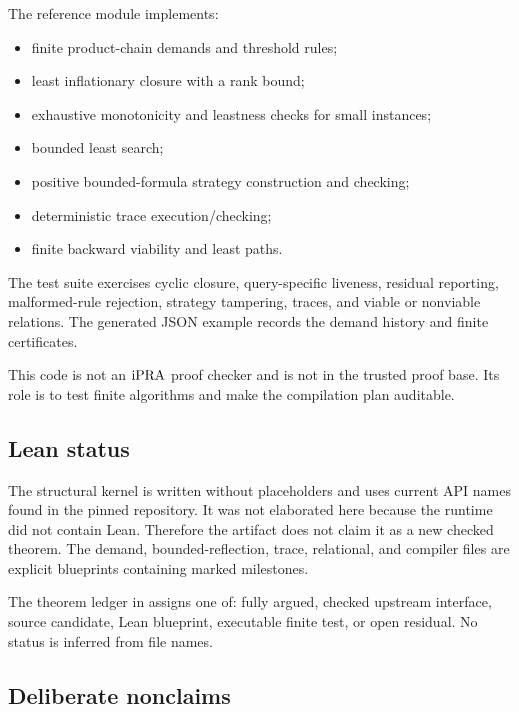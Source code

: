 The reference module  implements:
\begin{itemize}
  \item finite product-chain demands and threshold rules;
  \item least inflationary closure with a rank bound;
  \item exhaustive monotonicity and leastness checks for small instances;
  \item bounded least search;
  \item positive bounded-formula strategy construction and checking;
  \item deterministic trace execution/checking;
  \item finite backward viability and least paths.
\end{itemize}
The test suite exercises cyclic closure, query-specific liveness, residual
reporting, malformed-rule rejection, strategy tampering, traces, and viable or
nonviable relations.  The generated JSON example records the demand history and
finite certificates.

This code is not an \(\mathrm{iPRA}\) proof checker and is not in the trusted proof
base.  Its role is to test finite algorithms and make the compilation plan
auditable.

\subsection{Lean status}

The structural kernel is written without placeholders and uses current API
names found in the pinned repository.  It was not elaborated here because the
runtime did not contain Lean.  Therefore the artifact does not claim it as a
new checked theorem.  The demand, bounded-reflection, trace, relational, and
compiler files are explicit blueprints containing marked 
milestones.

The theorem ledger in  assigns one of:
fully argued, checked upstream interface, source candidate, Lean blueprint,
executable finite test, or open residual.  No status is inferred from file
names.

\subsection{Deliberate nonclaims}

